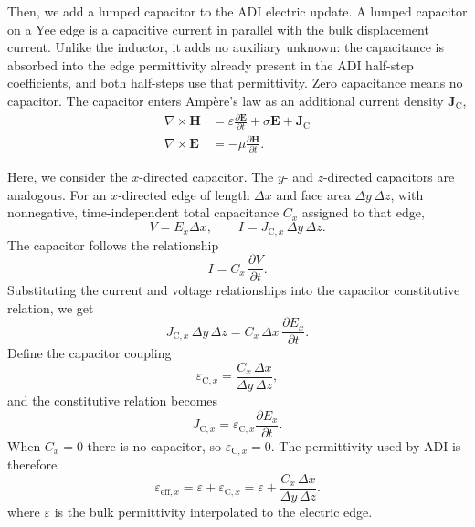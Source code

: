 \documentclass{article}
\numberwithin{equation}{section}
\numberwithin{figure}{section}
\begin{document}
Then, we add a lumped capacitor to the ADI electric update. A lumped capacitor on a Yee edge is a capacitive current in parallel with the bulk displacement current. Unlike the inductor, it adds no auxiliary unknown: the capacitance is absorbed into the edge permittivity already present in the ADI half-step coefficients, and both half-steps use that permittivity. Zero capacitance means no capacitor. The capacitor enters Amp\`ere's law as an additional current density $\mathbf{J}_\mathrm{C}$,
\begin{subequations}\label{eq:maxwell-capacitor}
    \begin{align}
        \nabla \times \mathbf{H} & = \varepsilon \frac{\partial \mathbf{E}}{\partial t} + \sigma \mathbf{E} + \mathbf{J}_\mathrm{C}
        \label{eq:maxwell-ampere-capacitor}                                                                                         \\
        \nabla \times \mathbf{E} & = -\mu \frac{\partial \mathbf{H}}{\partial t}.
        \label{eq:maxwell-faraday-capacitor}
    \end{align}
\end{subequations}

Here, we consider the $x$-directed capacitor. The $y$- and $z$-directed capacitors are analogous. For an $x$-directed edge of length $\Delta x$ and face area $\Delta y\,\Delta z$, with nonnegative, time-independent total capacitance $C_x$ assigned to that edge,
\begin{equation}
    V = E_x\Delta x, \qquad I = J_{\mathrm{C},x}\,\Delta y\,\Delta z.
\end{equation}
The capacitor follows the relationship
\begin{equation}
    I = C_x\,\frac{\partial V}{\partial t}.
\end{equation}
Substituting the current and voltage relationships into the capacitor constitutive relation, we get
\begin{equation}\label{eq:capacitor-constitutive}
    J_{\mathrm{C},x}\,\Delta y\,\Delta z = C_x\,\Delta x\,\frac{\partial E_x}{\partial t}.
\end{equation}
Define the capacitor coupling
\begin{equation}\label{eq:capacitor-coupling}
    \varepsilon_{\mathrm{C},x} = \frac{C_x\,\Delta x}{\Delta y\,\Delta z},
\end{equation}
and the constitutive relation becomes
\begin{equation}\label{eq:capacitor-current}
    J_{\mathrm{C},x} = \varepsilon_{\mathrm{C},x}\frac{\partial E_x}{\partial t}.
\end{equation}
When $C_x=0$ there is no capacitor, so $\varepsilon_{\mathrm{C},x}=0$. The permittivity used by ADI is therefore
\begin{equation}\label{eq:capacitor-epsilon-eff}
    \varepsilon_{\mathrm{eff},x} = \varepsilon + \varepsilon_{\mathrm{C},x} = \varepsilon + \frac{C_x\,\Delta x}{\Delta y\,\Delta z}.
\end{equation}
where $\varepsilon$ is the bulk permittivity interpolated to the electric edge.
\end{document}
